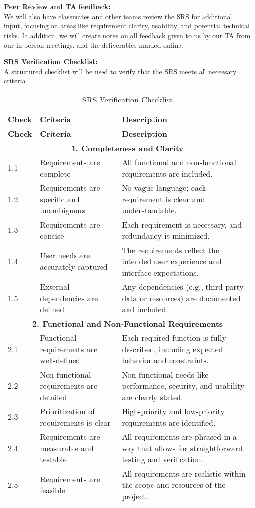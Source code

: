 \documentclass[12pt, titlepage]{article}
\begin{document}
\textbf{Peer Review and TA feedback:} \\
We will also have classmates and other teams review the SRS for additional input, focusing on areas like requirement clarity, usability, and potential technical risks. In addition, we will create notes on all feedback given to us by our TA from our in person meetings, and the deliverables marked online.

\textbf{SRS Verification Checklist:} \\
A structured checklist will be used to verify that the SRS meets all necessary criteria.


\begin{longtable}{|p{1cm}|p{5.5cm}|p{8.5cm}|}
\caption{SRS Verification Checklist} \\
\hline
\textbf{Check} & \textbf{Criteria} & \textbf{Description} \\
\hline
\endfirsthead
\hline
\textbf{Check} & \textbf{Criteria} & \textbf{Description} \\
\hline
\endhead

\multicolumn{3}{|c|}{\textbf{1. Completeness and Clarity}} \\
\hline
1.1 & Requirements are complete & All functional and non-functional requirements are included. \\
\hline
1.2 & Requirements are specific and unambiguous & No vague language; each requirement is clear and understandable. \\
\hline
1.3 & Requirements are concise & Each requirement is necessary, and redundancy is minimized. \\
\hline
1.4 & User needs are accurately captured & The requirements reflect the intended user experience and interface expectations. \\
\hline
1.5 & External dependencies are defined & Any dependencies (e.g., third-party data or resources) are documented and included. \\
\hline

\multicolumn{3}{|c|}{\textbf{2. Functional and Non-Functional Requirements}} \\
\hline
2.1 & Functional requirements are well-defined & Each required function is fully described, including expected behavior and constraints. \\
\hline
2.2 & Non-functional requirements are detailed & Non-functional needs like performance, security, and usability are clearly stated. \\
\hline
2.3 & Prioritization of requirements is clear & High-priority and low-priority requirements are identified. \\
\hline
2.4 & Requirements are measurable and testable & All requirements are phrased in a way that allows for straightforward testing and verification. \\
\hline
2.5 & Requirements are feasible & All requirements are realistic within the scope and resources of the project. \\
\hline


\end{longtable}
\end{document}
